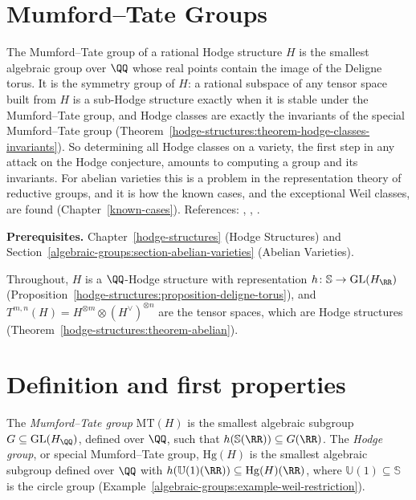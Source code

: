 \section{Mumford--Tate Groups}\label{hodge-structures:section-mumford-tate}
The Mumford--Tate group of a rational Hodge structure $H$ is the smallest algebraic group over $\QQ$ whose real points contain the image of the Deligne torus.
It is the symmetry group of $H$: a rational subspace of any tensor space built from $H$ is a sub-Hodge structure exactly when it is stable under the
Mumford--Tate group, and Hodge classes are exactly the invariants of the special Mumford--Tate group (Theorem~\ref{hodge-structures:theorem-hodge-classes-invariants}). So
determining all Hodge classes on a variety, the first step in any attack on the Hodge conjecture, amounts to computing a group and its invariants. For abelian varieties this is
a problem in the representation theory of reductive groups, and it is how the known cases, and the exceptional Weil classes, are found (Chapter~\ref{known-cases}). References:
\cite{deligne-abelian}, \cite{birkenhake-lange}, \cite{ggk-mumford-tate}.

\noindent\textbf{Prerequisites.} Chapter~\ref{hodge-structures} (Hodge Structures) and Section~\ref{algebraic-groups:section-abelian-varieties} (Abelian Varieties).

Throughout, $H$ is a $\QQ$-Hodge structure with representation $h \colon \mathbb{S} \to \mathrm{GL}(H_\RR)$ (Proposition~\ref{hodge-structures:proposition-deligne-torus}), and
$T^{m,n}(H) = H^{\otimes m} \otimes (H^\vee)^{\otimes n}$ are the tensor spaces, which are Hodge structures (Theorem~\ref{hodge-structures:theorem-abelian}).

\section{Definition and first properties}\label{hodge-structures:section-definition-mumford-tate}

\begin{definition}\label{hodge-structures:definition-mumford-tate}
The \emph{Mumford--Tate group} $\mathrm{MT}(H)$ is the smallest algebraic subgroup $G \subseteq \mathrm{GL}(H_\QQ)$, defined over $\QQ$, such that $h(\mathbb{S}(\RR)) \subseteq G(\RR)$. The
\emph{Hodge group}, or special Mumford--Tate group, $\mathrm{Hg}(H)$ is the smallest algebraic subgroup defined over $\QQ$ with $h(\mathbb{U}(1)(\RR)) \subseteq \mathrm{Hg}(H)(\RR)$, where
$\mathbb{U}(1) \subseteq \mathbb{S}$ is the circle group (Example~\ref{algebraic-groups:example-weil-restriction}).
\end{definition}

